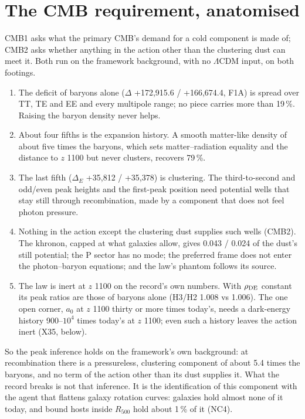 \documentclass[10pt]{article}
\begin{document}
\section{The CMB requirement, anatomised}\label{sec:cmb}
CMB1 asks what the primary CMB's demand for a cold component is made of; CMB2 asks whether anything in the action other than the clustering dust can meet it. Both run on the framework background, with no $\Lambda$CDM input, on both footings.
\begin{enumerate}
\item The deficit of baryons alone ($\Delta$ +172,915.6 / +166,674.4, F1A) is spread over TT, TE and EE and every multipole range; no piece carries more than 19\,\%. Raising the baryon density never helps.
\item About four fifths is the expansion history. A smooth matter-like density of about five times the baryons, which sets matter--radiation equality and the distance to $z$ 1100 but never clusters, recovers 79\,\%.
\item The last fifth ($\Delta_E$ +35,812 / +35,378) is clustering. The third-to-second and odd/even peak heights and the first-peak position need potential wells that stay still through recombination, made by a component that does not feel photon pressure.
\item Nothing in the action except the clustering dust supplies such wells (CMB2). The khronon, capped at what galaxies allow, gives 0.043 / 0.024 of the dust's still potential; the P sector has no mode; the preferred frame does not enter the photon--baryon equations; and the law's phantom follows its source.
\item The law is inert at $z$ 1100 on the record's own numbers. With $\rho_{\rm DE}$ constant its peak ratios are those of baryons alone (H3/H2 1.008 vs 1.006). The one open corner, $a_0$ at $z$ 1100 thirty or more times today's, needs a dark-energy history 900--$10^4$ times today's at $z$ 1100; even such a history leaves the action inert (X35, below).
\end{enumerate}
So the peak inference holds on the framework's own background: at recombination there is a pressureless, clustering component of about 5.4 times the baryons, and no term of the action other than its dust supplies it. What the record breaks is not that inference. It is the identification of this component with the agent that flattens galaxy rotation curves: galaxies hold almost none of it today, and bound hosts inside $R_{500}$ hold about 1\,\% of it (NC4).
\end{document}
